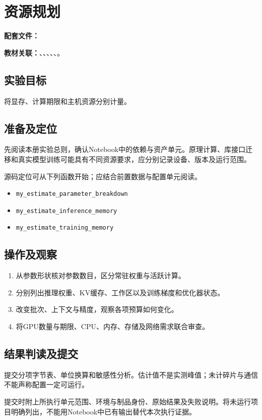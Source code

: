 \chapter{资源规划}
\label{lab:A10_resource_planning}

\noindent\textbf{配套文件：}\par
\noindent\textbf{教材关联：}、、、、、。

\section*{实验目标}
将显存、计算期限和主机资源分别计量。

\section*{准备及定位}
先阅读本册实验总则，确认Notebook中的依赖与资产单元。原理计算、库接口迁移和真实模型训练可能具有不同资源要求，应分别记录设备、版本及运行范围。

源码定位可从下列函数开始；应结合前置数据与配置单元阅读。
\begin{itemize}
\item \texttt{my\_estimate\_parameter\_breakdown}
\item \texttt{my\_estimate\_inference\_memory}
\item \texttt{my\_estimate\_training\_memory}
\end{itemize}

\section*{操作及观察}
\begin{enumerate}
\item 从参数形状核对参数数目，区分常驻权重与活跃计算。
\item 分别列出推理权重、KV缓存、工作区以及训练梯度和优化器状态。
\item 改变批次、上下文与精度，观察各项预算如何变化。
\item 将GPU数量与期限、CPU、内存、存储及网络需求联合审查。
\end{enumerate}

\section*{结果判读及提交}
提交分项字节表、单位换算和敏感性分析。估计值不是实测峰值；未计碎片与通信不能声称配置一定可运行。

提交时附上所执行单元范围、环境与制品身份、原始结果及失败说明。将未运行项目明确列出，不能用Notebook中已有输出替代本次执行证据。

